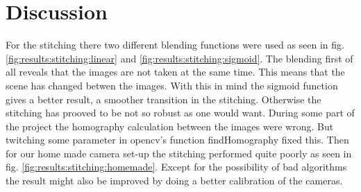 \section{Discussion}
For the stitching there two different blending functions were used as seen in fig. \ref{fig:results:stitching:linear} and \ref{fig:results:stitching:sigmoid}. The blending first of all reveals that the images are not taken at the same time. This means that the scene has changed betwen the images. With this in mind the sigmoid function gives a better result, a smoother transition in the stitching. Otherwise the stitching has prooved to be not so robust as one would want. During some part of the project the homography calculation between the images were wrong. But twitching some parameter in opencv's function findHomography fixed this. Then for our home made camera set-up the stitching performed quite poorly as seen in fig. \ref{fig:results:stitching:homemade}. Except for the possibility of bad algorithms the result might also be improved by doing a better calibration of the cameras.
